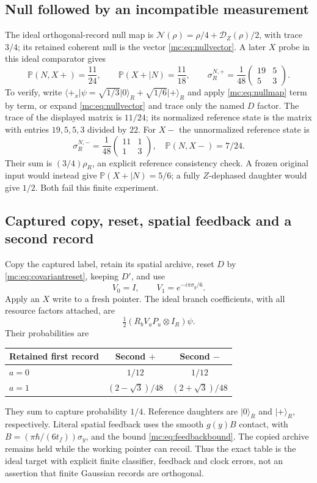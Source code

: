 \documentclass[11pt,oneside,openany]{book}
\theoremstyle{definition}
\theoremstyle{remark}\newtheorem{remark}[theorem]{Remark}
\providecommand{\Prb}{\mathbb P}
\providecommand{\ket}[1]{\lvert#1\rangle}
\providecommand{\bra}[1]{\langle#1\rvert}
\begin{document}
\subsection{Null followed by an incompatible measurement}
The ideal orthogonal-record null map is $\mathcal N(\rho)=\rho/4+\mathcal D_Z(\rho)/2$, with trace $3/4$; its retained coherent null is the vector \eqref{mc:eq:nullvector}. A later $X$ probe in this ideal comparator gives
\begin{equation}\label{mc:eq:nullnumbers}
 \Prb(N,X+)=\frac{11}{24},\qquad
 \Prb(X+\mid N)=\frac{11}{18},\qquad
 \sigma_R^{N,+}=\frac1{48}
               \begin{pmatrix}19&5\\5&3\end{pmatrix}.
\end{equation}
To verify, write $\bra{+_x}\psi=\sqrt{1/3}\ket0_R+\sqrt{1/6}\ket+_R$ and apply \eqref{mc:eq:nullmap} term by term, or expand \eqref{mc:eq:nullvector} and trace only the named $D$ factor. The trace of the displayed matrix is $11/24$; its normalized reference state is the matrix with entries $19,5,5,3$ divided by $22$. For $X-$ the unnormalized reference state is
\[
 \sigma_R^{N,-}=\frac1{48}\begin{pmatrix}11&1\\1&3\end{pmatrix},
 \quad\Prb(N,X-)=7/24.
\]
Their sum is $(3/4)\rho_R$, an explicit reference consistency check. A frozen original input would instead give $\Prb(X+\mid N)=5/6$; a fully $Z$-dephased daughter would give $1/2$. Both fail this finite experiment.

\subsection{Captured copy, reset, spatial feedback and a second record}
Copy the captured label, retain its spatial archive, reset $D$ by \eqref{mc:eq:covariantreset}, keeping $D'$, and use
\[
 V_0=I,\qquad V_1=e^{-i\pi\sigma_y/6}.
\]
Apply an $X$ write to a fresh pointer. The ideal branch coefficients, with all resource factors attached, are
\[
 \tfrac12(R_bV_aP_a\otimes I_R)\psi.
\]
Their probabilities are
\begin{center}
\begin{tabular}{@{}lcc@{}}\toprule
Retained first record & Second $+$ & Second $-$\\\midrule
$a=0$ & $1/12$ & $1/12$\\
$a=1$ & $(2-\sqrt3)/48$ & $(2+\sqrt3)/48$\\\bottomrule
\end{tabular}
\end{center}
They sum to capture probability $1/4$. Reference daughters are $\ket0_R$ and $\ket+_R$, respectively. Literal spatial feedback uses the smooth $g(y)B$ contact, with $B=(\pi\hbar/(6t_f))\sigma_y$, and the bound \eqref{mc:eq:feedbackbound}. The copied archive remains held while the working pointer can recoil. Thus the exact table is the ideal target with explicit finite classifier, feedback and clock errors, not an assertion that finite Gaussian records are orthogonal.
\end{document}
